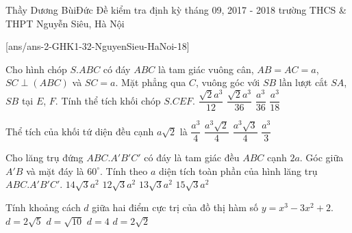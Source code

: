 \begin{name}
{Thầy Dương BùiĐức}
{Đề kiểm tra định kỳ tháng 09, 2017 - 2018 trường THCS \& THPT Nguyễn Siêu, Hà Nội}
\end{name}
\setcounter{ex}{0}
[ans/ans-2-GHK1-32-NguyenSieu-HaNoi-18]
\begin{ex}%
Cho hình chóp $S.ABC$ có đáy $ABC$ là tam giác vuông cân, $AB=AC=a$, $SC\perp (ABC)$ và $SC=a$. Mặt phẳng qua $C$, vuông góc với $SB$ lần lượt cắt $SA$, $SB$ tại $E$, $F$. Tính thể tích khối chóp $S.CEF$.
\choice
{$\dfrac{\sqrt{2}a^{3}}{12}$}
{$\dfrac{\sqrt{2}a^{3}}{36}$}
{\True $\dfrac{a^{3}}{36}$}
{$\dfrac{a^{3}}{18}$}
\end{ex}
\begin{ex}%
Thể tích của khối tứ diện đều cạnh $a\sqrt{2}$ là
\choice
{$\dfrac{a^{3}}{4}$}
{$\dfrac{a^{3}\sqrt{2}}{4}$}
{$\dfrac{a^{3}\sqrt{3}}{4}$}
{\True $\dfrac{a^{3}}{3}$}
\end{ex}
\begin{ex}%
Cho lăng trụ đứng $ABC.A'B'C'$ có đáy là tam giác đều $ABC$ cạnh $2a$. Góc giữa $A'B$ và mặt đáy là $60^{\circ}$. Tính theo $a$ diện tích toàn phần của hình lăng trụ $ABC.A'B'C'$.
\choice
{\True $14\sqrt{3}a^{2}$}
{$12\sqrt{3}a^{2}$}
{$13\sqrt{3}a^{2}$}
{$15\sqrt{3}a^{2}$}
\end{ex}
\begin{ex}%
Tính khoảng cách $d$ giữa hai điểm cực trị của đồ thị hàm số $y=x^{3}-3x^{2}+2$.
\choice
{\True $d=2\sqrt{5}$}
{$d=\sqrt{10}$}
{$d=4$}
{$d=2\sqrt{2}$}
\end{ex}
